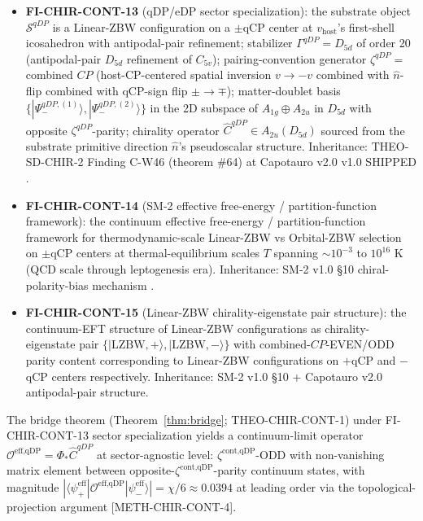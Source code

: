 \documentclass[11pt,letterpaper]{article}
\newcommand{\Phicont}{\Phi_*}
\newcommand{\OeffqDP}{\mathcal{O}^{\text{eff,qDP}}}
\newcommand{\methref}[1]{\textsf{\small[\textsc{#1}]}}
\begin{document}
\begin{itemize}[leftmargin=*]
\item \textbf{FI-CHIR-CONT-13} (qDP/eDP sector specialization): the substrate object $\mathcal{S}^{qDP}$ is a Linear-ZBW configuration on a $\pm$qCP center at $v_{\text{host}}$'s first-shell icosahedron with antipodal-pair refinement; stabilizer $\Gamma^{qDP} = D_{5d}$ of order 20 (antipodal-pair $D_{5d}$ refinement of $C_{5v}$); pairing-convention generator $\zeta^{qDP} = $ combined $CP$ (host-CP-centered spatial inversion $v \to -v$ combined with $\hat{n}$-flip combined with qCP-sign flip $\pm \to \mp$); matter-doublet basis $\{|\Psi_-^{qDP,(1)}\rangle, |\Psi_-^{qDP,(2)}\rangle\}$ in the 2D subspace of $A_{1g} \oplus A_{2u}$ in $D_{5d}$ with opposite $\zeta^{qDP}$-parity; chirality operator $\hat{C}^{qDP} \in A_{2u}(D_{5d})$ sourced from the substrate primitive direction $\hat{n}$'s pseudoscalar structure. Inheritance: THEO-SD-CHIR-2 Finding C-W46 (theorem \#64) at Capotauro v2.0 v1.0 SHIPPED \cite{Capotauro}.

\item \textbf{FI-CHIR-CONT-14} (SM-2 effective free-energy / partition-function framework): the continuum effective free-energy / partition-function framework for thermodynamic-scale Linear-ZBW vs Orbital-ZBW selection on $\pm$qCP centers at thermal-equilibrium scales $T$ spanning $\sim 10^{-3}$ to $10^{16}$ K (QCD scale through leptogenesis era). Inheritance: SM-2 v1.0 §10 chiral-polarity-bias mechanism \cite{SM2v1}.

\item \textbf{FI-CHIR-CONT-15} (Linear-ZBW chirality-eigenstate pair structure): the continuum-EFT structure of Linear-ZBW configurations as chirality-eigenstate pair $\{|\text{LZBW},+\rangle, |\text{LZBW},-\rangle\}$ with combined-$CP$-EVEN/ODD parity content corresponding to Linear-ZBW configurations on $+$qCP and $-$qCP centers respectively. Inheritance: SM-2 v1.0 §10 + Capotauro v2.0 antipodal-pair structure.
\end{itemize}

The bridge theorem (Theorem~\ref{thm:bridge}; THEO-CHIR-CONT-1) under FI-CHIR-CONT-13 sector specialization yields a continuum-limit operator $\OeffqDP = \Phicont\hat{C}^{qDP}$ at sector-agnostic level: $\zeta^{\text{cont,qDP}}$-ODD with non-vanishing matrix element between opposite-$\zeta^{\text{cont,qDP}}$-parity continuum states, with magnitude $|\langle\psi^{\text{eff}}_+|\OeffqDP|\psi^{\text{eff}}_-\rangle| = \chi/6 \approx 0.0394$ at leading order via the topological-projection argument \methref{METH-CHIR-CONT-4}.
\end{document}
